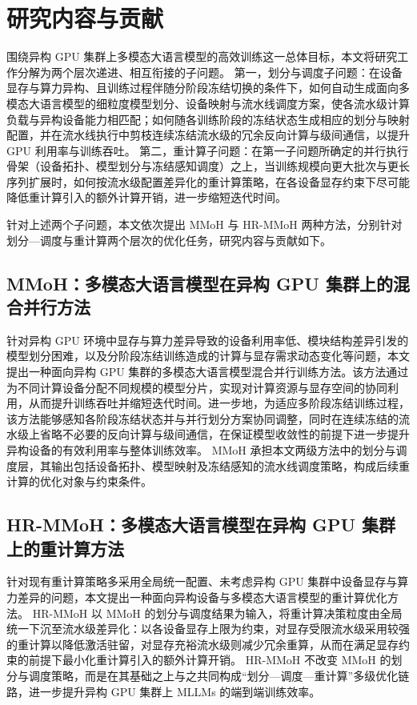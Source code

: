 \section{研究内容与贡献}

围绕异构 GPU 集群上多模态大语言模型的高效训练这一总体目标，本文将研究工作分解为两个层次递进、相互衔接的子问题。
第一，划分与调度子问题：在设备显存与算力异构、且训练过程伴随分阶段冻结切换的条件下，如何自动生成面向多模态大语言模型的细粒度模型划分、设备映射与流水线调度方案，使各流水级计算负载与异构设备能力相匹配；如何随各训练阶段的冻结状态生成相应的划分与映射配置，并在流水线执行中剪枝连续冻结流水级的冗余反向计算与级间通信，以提升 GPU 利用率与训练吞吐。
第二，重计算子问题：在第一子问题所确定的并行执行骨架（设备拓扑、模型划分与冻结感知调度）之上，当训练规模向更大批次与更长序列扩展时，如何按流水级配置差异化的重计算策略，在各设备显存约束下尽可能降低重计算引入的额外计算开销，进一步缩短迭代时间。

针对上述两个子问题，本文依次提出 MMoH 与 HR-MMoH 两种方法，分别针对划分—调度与重计算两个层次的优化任务，研究内容与贡献如下。

\subsection{MMoH：多模态大语言模型在异构 GPU 集群上的混合并行方法}

针对异构 GPU 环境中显存与算力差异导致的设备利用率低、模块结构差异引发的模型划分困难，以及分阶段冻结训练造成的计算与显存需求动态变化等问题，本文提出一种面向异构 GPU 集群的多模态大语言模型混合并行训练方法。该方法通过为不同计算设备分配不同规模的模型分片，实现对计算资源与显存空间的协同利用，从而提升训练吞吐并缩短迭代时间。进一步地，为适应多阶段冻结训练过程，该方法能够感知各阶段冻结状态并与并行划分方案协同调整，同时在连续冻结的流水级上省略不必要的反向计算与级间通信，在保证模型收敛性的前提下进一步提升异构设备的有效利用率与整体训练效率。
MMoH 承担本文两级方法中的划分与调度层，其输出包括设备拓扑、模型映射及冻结感知的流水线调度策略，构成后续重计算的优化对象与约束条件。

\subsection{HR-MMoH：多模态大语言模型在异构 GPU 集群上的重计算方法}

针对现有重计算策略多采用全局统一配置、未考虑异构 GPU 集群中设备显存与算力差异的问题，本文提出一种面向异构设备与多模态大语言模型的重计算优化方法。
HR-MMoH 以 MMoH 的划分与调度结果为输入，将重计算决策粒度由全局统一下沉至流水级差异化：以各设备显存上限为约束，对显存受限流水级采用较强的重计算以降低激活驻留，对显存充裕流水级则减少冗余重算，从而在满足显存约束的前提下最小化重计算引入的额外计算开销。
HR-MMoH 不改变 MMoH 的划分与调度策略，而是在其基础之上与之共同构成“划分—调度—重计算”多级优化链路，进一步提升异构 GPU 集群上 MLLMs 的端到端训练效率。


